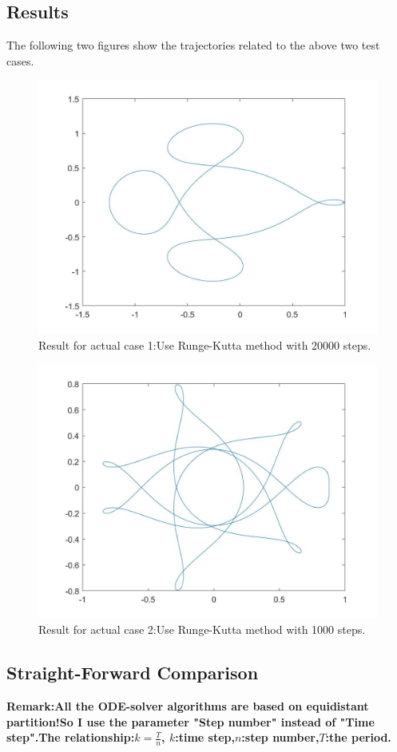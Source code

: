 \documentclass[UTF8]{ctexart}
\theoremstyle{plain}
\theoremstyle{definition}
\theoremstyle{remark}
\begin{document}
\subsection{Results}
The following two figures show the trajectories related to the above two test cases.
\begin{figure}[H]
\centering
\includegraphics[height=0.35\textheight,width=0.7\linewidth]{1}
\caption{Result for actual case 1:Use Runge-Kutta method with 20000 steps.}
\end{figure}
\begin{figure}[H]
\centering
\includegraphics[height=0.35\textheight,width=0.7\linewidth]{2}
\caption{Result for actual case 2:Use Runge-Kutta method with 1000 steps.}
\end{figure}
\subsection{Straight-Forward Comparison}
\textbf{Remark:All the ODE-solver algorithms are based on equidistant partition!So I use the parameter "Step number" instead of "Time step".The relationship:$k=\frac{T}{n}$, $k$:time step,$n$:step number,$T$:the period.}
\end{document}
